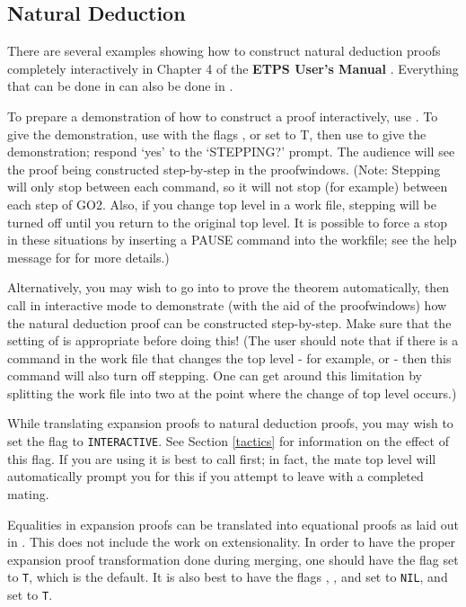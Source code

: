 \subsection{Natural Deduction}

There are several examples showing how to construct natural deduction
proofs completely interactively in Chapter 4 of the {\bf ETPS User's
Manual} \cite{AndrewsTPS88b}.  Everything that can be done in {\ETPS}
can also be done in {\TPS}.

To prepare a demonstration of how to construct a proof
interactively, use .  To give the demonstration, use
 with the flags ,
 or
 set to T, then
use  to give the demonstration;
respond `yes' to the `STEPPING?' prompt.
The audience will see the proof being constructed step-by-step in the
proofwindows. (Note: Stepping will only stop between each command, so it will not stop
(for example) between each step of GO2. Also, if you change top level in a work file,
stepping will be turned off until you return to the original top level. It is possible to force
a stop in these situations by inserting a PAUSE command into the workfile; see the help message
for  for more details.)

Alternatively, you may wish to go into  to prove the theorem
automatically, then call  in interactive mode to
demonstrate (with the aid of the proofwindows) how the natural deduction proof
can be constructed step-by-step. Make sure that the setting of 
is appropriate before doing this!
(The user should note that if there is a command in the
work file that changes the top level - for example, 
or  - then this command will also turn off stepping.
One can get around this limitation by splitting the work file into two at
the point where the change of top level occurs.)

While translating expansion proofs to natural deduction proofs, you
may wish to set the flag  to {\tt INTERACTIVE}.  See Section
\ref{tactics} for information on the effect of this flag. If you are using
 it is best to call  first;
in fact, the mate top level will automatically prompt you for this if you
attempt to leave with a completed mating.

Equalities in expansion proofs can be translated into equational
proofs as laid out in \cite{Pfenning86}.  This does not include the
work on extensionality.  In order to have the proper expansion
proof transformation done during merging, one should have the flag
 set to {\tt T}, which is the default.  It is also best to
have the flags , , and
 set to {\tt NIL}, and  set
to {\tt T}.

